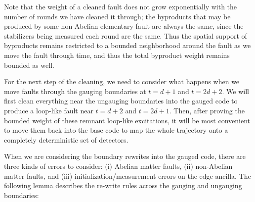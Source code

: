 \documentclass[11pt]{article}
\begin{document}
\begin{remark}
    Note that the weight of a cleaned fault does not grow exponentially with the number of rounds we have cleaned it through; the byproducts that may be produced by some non-Abelian elementary fault are always the same, since the stabilizers being measured each round are the same. Thus the spatial support of byproducts remains restricted to a bounded neighborhood around the fault as we move the fault through time, and thus the total byproduct weight remains bounded as well.
\end{remark}


For the next step of the cleaning, we need to consider what happens when we move faults through the gauging boundaries at $t=d+1$ and $t=2d+2$. We will first clean everything near the ungauging boundaries into the gauged code to produce a loop-like fault near $t=d+2$ and $t=2d+1$. Then, after proving the bounded weight of these remnant loop-like excitations, it will be most convenient to move them back into the base code to map the whole trajectory onto a completely deterministic set of detectors. 

When we are considering the boundary rewrites into the gauged code, there are three kinds of errors to consider: (i) Abelian matter faults, (ii) non-Abelian matter faults, and (iii) initialization/measurement errors on the edge ancilla. The following lemma describes the re-write rules across the gauging and ungauging boundaries:
\end{document}
